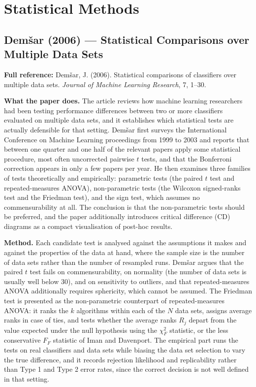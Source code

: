 \documentclass[11pt, a4paper]{article}
\begin{document}
\vspace{8pt}

\clearpage
\section{Statistical Methods}

\subsection{Dem\v{s}ar (2006) --- Statistical Comparisons over Multiple Data Sets}

\begin{refbox}
\textbf{Full reference:} Dem\v{s}ar, J. (2006). Statistical comparisons of classifiers over multiple data sets. \emph{Journal of Machine Learning Research}, 7, 1--30.
\end{refbox}

\textbf{What the paper does.} The article reviews how machine learning researchers had been testing performance differences between two or more classifiers evaluated on multiple data sets, and it establishes which statistical tests are actually defensible for that setting. Dem\v{s}ar first surveys the International Conference on Machine Learning proceedings from 1999 to 2003 and reports that between one quarter and one half of the relevant papers apply some statistical procedure, most often uncorrected pairwise $t$ tests, and that the Bonferroni correction appears in only a few papers per year. He then examines three families of tests theoretically and empirically: parametric tests (the paired $t$ test and repeated-measures ANOVA), non-parametric tests (the Wilcoxon signed-ranks test and the Friedman test), and the sign test, which assumes no commensurability at all. The conclusion is that the non-parametric tests should be preferred, and the paper additionally introduces critical difference (CD) diagrams as a compact visualisation of post-hoc results.

\textbf{Method.} Each candidate test is analysed against the assumptions it makes and against the properties of the data at hand, where the sample size is the number of data sets rather than the number of resampled runs. Dem\v{s}ar argues that the paired $t$ test fails on commensurability, on normality (the number of data sets is usually well below 30), and on sensitivity to outliers, and that repeated-measures ANOVA additionally requires sphericity, which cannot be assumed. The Friedman test is presented as the non-parametric counterpart of repeated-measures ANOVA: it ranks the $k$ algorithms within each of the $N$ data sets, assigns average ranks in case of ties, and tests whether the average ranks $R_j$ depart from the value expected under the null hypothesis using the $\chi^2_F$ statistic, or the less conservative $F_F$ statistic of Iman and Davenport. The empirical part runs the tests on real classifiers and data sets while biasing the data set selection to vary the true difference, and it records rejection likelihood and replicability rather than Type 1 and Type 2 error rates, since the correct decision is not well defined in that setting.
\end{document}

